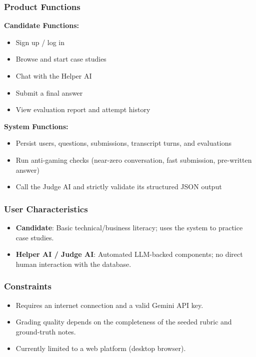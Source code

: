 \documentclass[12pt,a4paper]{report}
\begin{document}
\subsubsection{Product Functions}
\textbf{Candidate Functions:}
\begin{itemize}[nosep]
    \item Sign up / log in
    \item Browse and start case studies
    \item Chat with the Helper AI
    \item Submit a final answer
    \item View evaluation report and attempt history
\end{itemize}
\textbf{System Functions:}
\begin{itemize}[nosep]
    \item Persist users, questions, submissions, transcript turns, and evaluations
    \item Run anti-gaming checks (near-zero conversation, fast submission, pre-written answer)
    \item Call the Judge AI and strictly validate its structured JSON output
\end{itemize}

\subsubsection{User Characteristics}
\begin{itemize}[nosep]
    \item \textbf{Candidate}: Basic technical/business literacy; uses the system to practice case
    studies.
    \item \textbf{Helper AI / Judge AI}: Automated LLM-backed components; no direct human
    interaction with the database.
\end{itemize}

\subsubsection{Constraints}
\begin{itemize}[nosep]
    \item Requires an internet connection and a valid Gemini API key.
    \item Grading quality depends on the completeness of the seeded rubric and ground-truth
    notes.
    \item Currently limited to a web platform (desktop browser).
\end{itemize}
\end{document}
